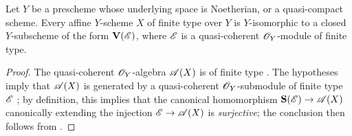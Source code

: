 \begin{proposition}[1.7.15]
\label{II.1.7.15}
Let $Y$ be a prescheme whose underlying space is Noetherian, or a quasi-compact scheme.
Every affine $Y$-scheme $X$ of finite type over $Y$ is $Y$-isomorphic to a closed $Y$-subscheme of the form $\mathbf{V}(\mathscr{E})$, where $\mathscr{E}$ is a quasi-coherent $\mathscr{O}_Y$-module of finite type.
\end{proposition}

\begin{proof}
The quasi-coherent $\mathscr{O}_Y$-algebra $\mathscr{A}(X)$ is of finite type .
The hypotheses imply that $\mathscr{A}(X)$ is generated by a quasi-coherent $\mathscr{O}_Y$-submodule of finite type $\mathscr{E}$ ; by definition, this implies that the canonical homomorphism $\bb{S}(\sh{E})\to\sh{A}(X)$ canonically extending the injection $\sh{E}\to\sh{A}(X)$ is \emph{surjective}; the conclusion then follows from .
\end{proof}

